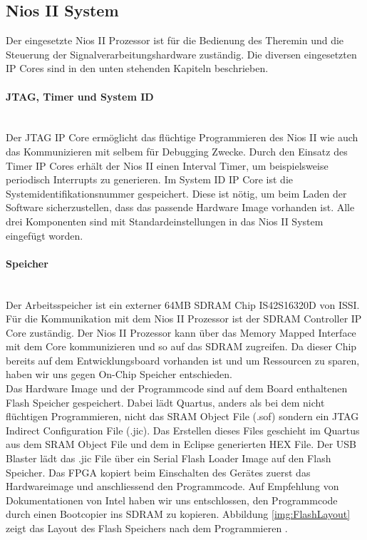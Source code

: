 \subsection{Nios II System}\label{subsec:CPU}
Der eingesetzte Nios II Prozessor ist für die Bedienung des Theremin und die Steuerung der Signalverarbeitungshardware zuständig. Die diversen eingesetzten IP Cores sind in den unten stehenden Kapiteln beschrieben.

\paragraph{JTAG, Timer und System ID}\mbox{}\\

Der JTAG IP Core ermöglicht das flüchtige Programmieren des Nios II wie auch das Kommunizieren mit selbem für Debugging Zwecke. 
Durch den Einsatz des Timer IP Cores erhält der Nios II einen Interval Timer, um beispielsweise periodisch Interrupts zu generieren. 
Im System ID IP Core ist die Systemidentifikationsnummer gespeichert. Diese ist nötig, um beim Laden der Software sicherzustellen, dass das passende Hardware Image vorhanden ist.
Alle drei Komponenten sind mit Standardeinstellungen in das Nios II System eingefügt worden.

\paragraph{Speicher}\mbox{}\\

Der Arbeitsspeicher ist ein externer 64MB SDRAM Chip IS42S16320D von ISSI. Für die Kommunikation mit dem Nios II Prozessor ist der SDRAM Controller IP Core zuständig. Der Nios II Prozessor kann über das Memory Mapped Interface mit dem Core kommunizieren und so auf das SDRAM zugreifen. Da dieser Chip bereits auf dem Entwicklungsboard vorhanden ist und um Ressourcen zu sparen, haben wir uns gegen On-Chip Speicher entschieden.\\

Das Hardware Image und der Programmcode sind auf dem Board enthaltenen Flash Speicher gespeichert. Dabei lädt Quartus, anders als bei dem nicht flüchtigen Programmieren, nicht das SRAM Object File (.sof) sondern ein JTAG Indirect Configuration File (.jic). Das Erstellen dieses Files geschieht im Quartus aus dem SRAM Object File und dem in Eclipse generierten HEX File. Der USB Blaster lädt das .jic File über ein Serial Flash Loader Image auf den Flash Speicher. Das FPGA kopiert beim Einschalten des Gerätes zuerst das Hardwareimage und anschliessend den Programmcode. Auf Empfehlung von Dokumentationen von Intel haben wir uns entschlossen, den Programmcode durch einen Bootcopier ins SDRAM zu kopieren. Abbildung \ref{img:FlashLayout} zeigt das Layout des Flash Speichers nach dem Programmieren \cite{non_volatile}.


